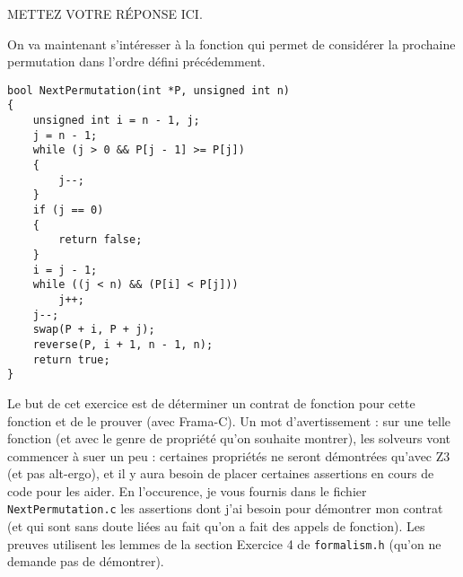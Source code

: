 \documentclass[11pt,answers]{exam}
\begin{document}
\begin{questions}
\begin{parts}
    \begin{solutionorbox}
        METTEZ VOTRE RÉPONSE ICI.
    \end{solutionorbox}

    \end{parts}



    On va maintenant s’intéresser à la fonction qui permet de considérer la prochaine permutation dans l’ordre défini précédemment.

    \begin{lstlisting}
bool NextPermutation(int *P, unsigned int n)
{
    unsigned int i = n - 1, j;
    j = n - 1;
    while (j > 0 && P[j - 1] >= P[j])
    {
        j--;
    }
    if (j == 0)
    {
        return false;
    }
    i = j - 1;
    while ((j < n) && (P[i] < P[j]))
        j++;
    j--;
    swap(P + i, P + j);
    reverse(P, i + 1, n - 1, n);
    return true;
}
    \end{lstlisting}

    Le but de cet exercice est de déterminer un contrat de fonction pour cette fonction et de le prouver (avec Frama-C).
    Un mot d’avertissement : sur une telle fonction (et avec le genre de propriété qu’on souhaite montrer), les solveurs vont commencer à suer un peu : certaines propriétés ne seront démontrées qu’avec Z3 (et pas alt-ergo), et il y aura besoin de placer certaines assertions en cours de code pour les aider. En l’occurence, je vous fournis dans le fichier \texttt{NextPermutation.c} les assertions dont j’ai besoin pour démontrer mon contrat (et qui sont sans doute liées au fait qu’on a fait des appels de fonction).
    Les preuves utilisent les lemmes de la section Exercice 4 de \texttt{formalism.h} (qu’on ne demande pas de démontrer).

\end{questions}
\end{document}
